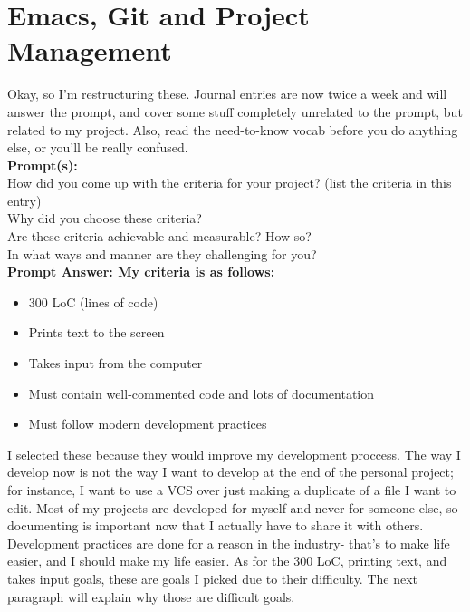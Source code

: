 \documentclass[11pt]{article}
\begin{document}
\section{Emacs, Git and Project Management}
Okay, so I'm restructuring these. Journal entries are now twice a week and will answer the prompt, and cover some stuff completely unrelated to the prompt, but related to my project. Also, read the need-to-know vocab before you do anything else, or you'll be really confused.\\
\textbf{Prompt(s):}\\
How did you come up with the criteria for your project? (list the criteria in this entry)\\
Why did you choose these criteria?\\
Are these criteria achievable and measurable? How so?\\
In what ways and manner are they challenging for you?\\
\textbf{Prompt Answer: My criteria is as follows:}\\
\begin{itemize}
\item 300 LoC (lines of code)
\item Prints text to the screen
\item Takes input from the computer
\item Must contain well-commented code and lots of documentation
\item Must follow modern development practices
\end{itemize}

I selected these because they would improve my development proccess. The way I develop now is not the way I want to develop at the end of the personal project; for instance, I want to use a VCS over just making a duplicate of a file I want to edit. Most of my projects are developed for myself and never for someone else, so documenting is important now that I actually have to share it with others. Development practices are done for a reason in the industry- that's to make life easier, and I should make my life easier. As for the 300 LoC, printing text, and takes input goals, these are goals I picked due to their difficulty. The next paragraph will explain why those are difficult goals.
\end{document}
